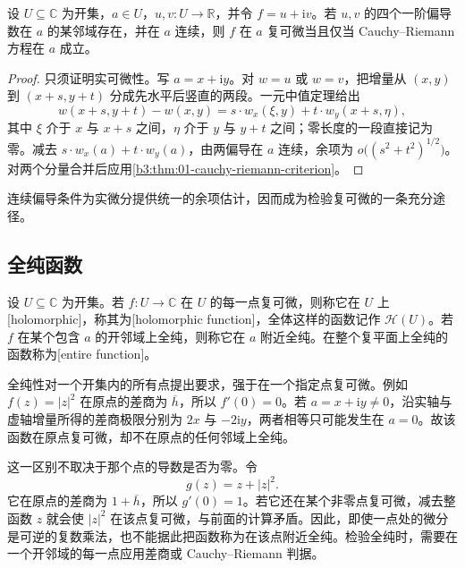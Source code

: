 \begin{corollary}\label{b3:cor:01-continuous-partial-criterion}
设 \(U\subseteq\mathbb C\) 为开集，\(a\in U\)，\(u,v:U\to\mathbb R\)，并令 \(f=u+\mathrm{i}v\)。若 \(u,v\) 的四个一阶偏导数在 \(a\) 的某邻域存在，并在 \(a\) 连续，则 \(f\) 在 \(a\) 复可微当且仅当 Cauchy--Riemann 方程在 \(a\) 成立。
\end{corollary}
\begin{proof}
只须证明实可微性。写 \(a=x+\mathrm{i}y\)。对 \(w=u\) 或 \(w=v\)，把增量从 \((x,y)\) 到 \((x+s,y+t)\) 分成先水平后竖直的两段。一元中值定理给出
\[
 w(x+s,y+t)-w(x,y)
 =s\cdot w_x(\xi,y)+t\cdot w_y(x+s,\eta),
\]
其中 \(\xi\) 介于 \(x\) 与 \(x+s\) 之间，\(\eta\) 介于 \(y\) 与 \(y+t\) 之间；零长度的一段直接记为零。减去 \(s\cdot w_x(a)+t\cdot w_y(a)\)，由两偏导在 \(a\) 连续，余项为 \(o\bigl((s^2+t^2)^{1/2}\bigr)\)。对两个分量合并后应用\cref{b3:thm:01-cauchy-riemann-criterion}。
\end{proof}

连续偏导条件为实微分提供统一的余项估计，因而成为检验复可微的一条充分途径。

\subsection{全纯函数}
\label{b3:subsec:010103}

\begin{definition}\label{b3:def:01-holomorphic}
设 \(U\subseteq\mathbb C\) 为开集。若 \(f:U\rightarrow\mathbb C\) 在 \(U\) 的每一点复可微，则称它在 \(U\) 上[holomorphic]，称其为[holomorphic function]，全体这样的函数记作 \(\mathcal H(U)\)。若 \(f\) 在某个包含 \(a\) 的开邻域上全纯，则称它在 \(a\) 附近全纯。在整个复平面上全纯的函数称为[entire function]。
\end{definition}

全纯性对一个开集内的所有点提出要求，强于在一个指定点复可微。例如 \(f(z)=\lvert z\rvert^2\) 在原点的差商为 \(\overline h\)，所以 \(f'(0)=0\)。若 \(a=x+\mathrm{i}y\ne0\)，沿实轴与虚轴增量所得的差商极限分别为 \(2x\) 与 \(-2\mathrm{i}y\)，两者相等只可能发生在 \(a=0\)。故该函数在原点复可微，却不在原点的任何邻域上全纯。

这一区别不取决于那个点的导数是否为零。令
\[
 g(z)=z+|z|^2.
\]
它在原点的差商为 \(1+\overline h\)，所以 \(g'(0)=1\)。若它还在某个非零点复可微，减去整函数 \(z\) 就会使 \(|z|^2\) 在该点复可微，与前面的计算矛盾。因此，即使一点处的微分是可逆的复数乘法，也不能据此把函数称为在该点附近全纯。检验全纯时，需要在一个开邻域的每一点应用差商或 Cauchy--Riemann 判据。

